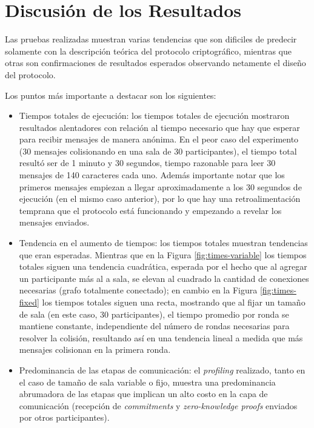 \section{Discusión de los Resultados}

Las pruebas realizadas muestran varias tendencias que son dificiles de predecir 
solamente con la descripción teórica del protocolo criptográfico, mientras que otras 
son confirmaciones de resultados esperados observando netamente el diseño del 
protocolo.

Los puntos más importante a destacar son los siguientes:

\begin{itemize}
	\item Tiempos totales de ejecución: los tiempos totales de ejecución mostraron 
	resultados alentadores con relación al tiempo necesario que hay que esperar para 
	recibir mensajes de manera anónima. En el peor caso del experimento (30 mensajes 
	colisionando en una sala de 30 participantes), el tiempo total resultó ser de 
	1 minuto y 30 segundos, tiempo razonable para leer 30 mensajes de 140 caracteres 
	cada uno. Además importante notar que los primeros mensajes empiezan a llegar 
	aproximadamente a los 30 segundos de ejecución (en el mismo caso anterior), por lo que 
	hay una retroalimentación temprana que el protocolo está funcionando y empezando a 
	revelar los mensajes enviados.
	\item Tendencia en el aumento de tiempos: los tiempos totales muestran tendencias 
	que eran esperadas. Mientras que en la Figura \ref{fig:times-variable} los tiempos 
	totales siguen una tendencia cuadrática, esperada por el hecho que al agregar 
	un participante más al a sala, se elevan al cuadrado la cantidad de conexiones 
	necesarias (grafo totalmente conectado); en cambio en la Figura \ref{fig:times-fixed} los
	tiempos totales siguen una recta, mostrando que al fijar un tamaño de sala (en este caso, 
	30 participantes), el tiempo promedio por ronda se mantiene constante, independiente 
	del número de rondas necesarias para resolver la colisión, resultando así en una 
	tendencia lineal a medida que más mensajes colisionan en la primera ronda.
	\item Predominancia de las etapas de comunicación: el \emph{profiling} realizado, tanto 
	en el caso de tamaño de sala variable o fijo, muestra una predominancia abrumadora 
	de las etapas que implican un alto costo en la capa de comunicación (recepción de 
	\emph{commitments} y \emph{zero-knowledge proofs} enviados por otros participantes). 

\end{itemize}
